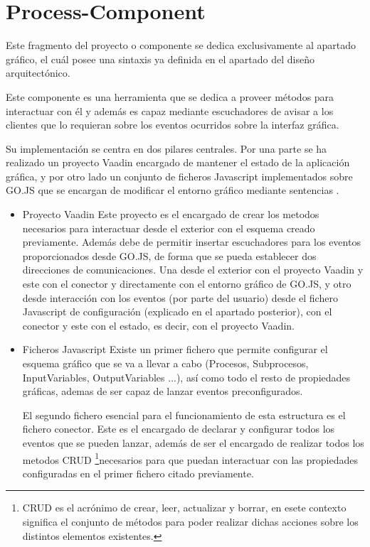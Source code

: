 \documentclass[a4paper,12pt]{book}
\begin{document}
	\minitoc
	
		\section{Process-Component}
		
		Este fragmento del proyecto o componente se dedica exclusivamente al apartado gráfico, el cuál posee una sintaxis ya definida en el apartado del diseño arquitectónico.
		
		
		\vspace{5mm}
		
		
		Este componente es una herramienta que se dedica a proveer métodos para interactuar con él y además es capaz mediante escuchadores de avisar a los clientes que lo requieran sobre los eventos ocurridos sobre la interfaz gráfica.
		
		\vspace{5mm}
		
		Su implementación se centra en dos pilares centrales. Por una parte se ha realizado un proyecto Vaadin encargado de mantener el estado de la aplicación gráfica, y por otro lado un conjunto de ficheros Javascript implementados sobre GO.JS que se encargan de modificar el entorno gráfico mediante sentencias .
		\begin{itemize}
			\item Proyecto Vaadin
			\subitem Este proyecto es el encargado de crear los metodos necesarios para interactuar desde el exterior con el esquema creado previamente. Además debe de permitir insertar escuchadores para los eventos proporcionados desde GO.JS, de forma que se pueda establecer dos direcciones de comunicaciones. Una desde el exterior con el proyecto Vaadin y este con el conector y directamente con el entorno gráfico de GO.JS, y otro desde interacción con los eventos (por parte del usuario) desde el fichero Javascript de configuración (explicado en el apartado posterior), con el conector y este con el estado, es decir, con el proyecto Vaadin.
			
			\item Ficheros Javascript
			\subitem Existe un primer fichero que permite configurar el esquema gráfico que se va a llevar a cabo (Procesos, Subprocesos, InputVariables, OutputVariables ...), así como todo el resto de propiedades gráficas, ademas de ser capaz de lanzar eventos preconfigurados.
			
			\vspace{5mm}
			
			El segundo fichero esencial para el funcionamiento de esta estructura es el fichero conector. Este es el encargado de declarar y configurar todos los eventos que se pueden lanzar, además de ser el encargado de realizar todos los metodos CRUD \footnote{CRUD es el acrónimo de crear, leer, actualizar y borrar, en esete contexto significa el conjunto de métodos para poder realizar dichas acciones sobre los distintos elementos existentes.}necesarios para que puedan interactuar con las propiedades configuradas en el primer fichero citado previamente.
		\end{itemize}
	
\end{document}
